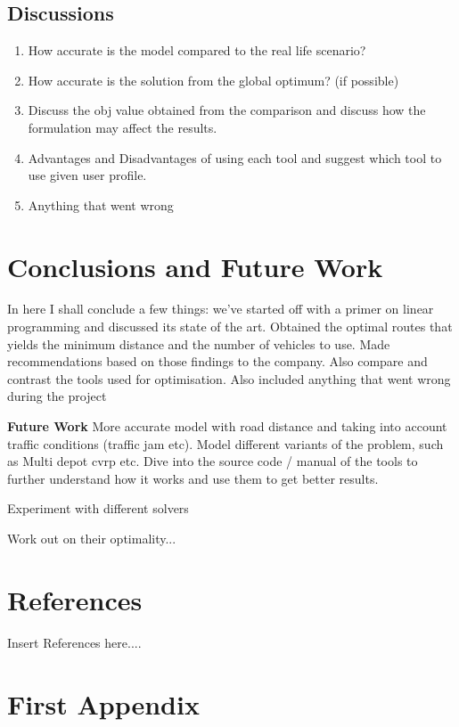 \documentclass[a4paper, 12pt]{report}
\begin{document}
\section{Discussions}
\begin{enumerate}
\item How accurate is the model compared to the real life scenario?
\item How accurate is the solution from the global optimum? (if possible)
\item Discuss the obj value obtained from the comparison and discuss how the formulation may affect the results.
\item Advantages and Disadvantages of using each tool and suggest which tool to use given user profile.
\item Anything that went wrong
\end{enumerate}

\chapter{Conclusions and Future Work}
In here I shall conclude a few things: we've started off with a primer on linear programming and discussed its state
 of the art. Obtained the optimal routes that yields the minimum distance and the number of vehicles to use. Made
 recommendations based on those findings to the company. Also compare and contrast the tools used for optimisation. Also
 included anything that went wrong during the project

\textbf{Future Work}
More accurate model with road distance and taking into account traffic conditions (traffic jam etc). Model
 different variants of the problem, such as Multi depot cvrp etc. Dive into the source  code / manual of
 the tools to further understand how it works and use them to get better results.

 Experiment with different solvers

 Work out on their optimality...

\chapter{References}
Insert References here....

\appendix
\chapter{First Appendix}
\end{document}
